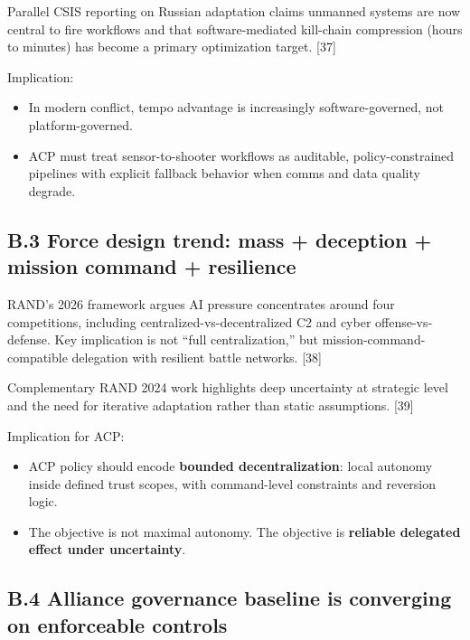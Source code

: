 \documentclass[
]{article}
\providecommand{\tightlist}{%
  \setlength{\itemsep}{0pt}\setlength{\parskip}{0pt}}
\begin{document}
Parallel CSIS reporting on Russian adaptation claims unmanned systems
are now central to fire workflows and that software-mediated kill-chain
compression (hours to minutes) has become a primary optimization target.
{[}37{]}

Implication:

\begin{itemize}
\tightlist
\item
  In modern conflict, tempo advantage is increasingly software-governed,
  not platform-governed.
\item
  ACP must treat sensor-to-shooter workflows as auditable,
  policy-constrained pipelines with explicit fallback behavior when
  comms and data quality degrade.
\end{itemize}

\hypertarget{b.3-force-design-trend-mass-deception-mission-command-resilience}{%
\subsection{B.3 Force design trend: mass + deception + mission command +
resilience}\label{b.3-force-design-trend-mass-deception-mission-command-resilience}}

RAND's 2026 framework argues AI pressure concentrates around four
competitions, including centralized-vs-decentralized C2 and cyber
offense-vs-defense. Key implication is not ``full centralization,'' but
mission-command-compatible delegation with resilient battle networks.
{[}38{]}

Complementary RAND 2024 work highlights deep uncertainty at strategic
level and the need for iterative adaptation rather than static
assumptions. {[}39{]}

Implication for ACP:

\begin{itemize}
\tightlist
\item
  ACP policy should encode \textbf{bounded decentralization}: local
  autonomy inside defined trust scopes, with command-level constraints
  and reversion logic.
\item
  The objective is not maximal autonomy. The objective is
  \textbf{reliable delegated effect under uncertainty}.
\end{itemize}

\hypertarget{b.4-alliance-governance-baseline-is-converging-on-enforceable-controls}{%
\subsection{B.4 Alliance governance baseline is converging on
enforceable
controls}\label{b.4-alliance-governance-baseline-is-converging-on-enforceable-controls}}
\end{document}
